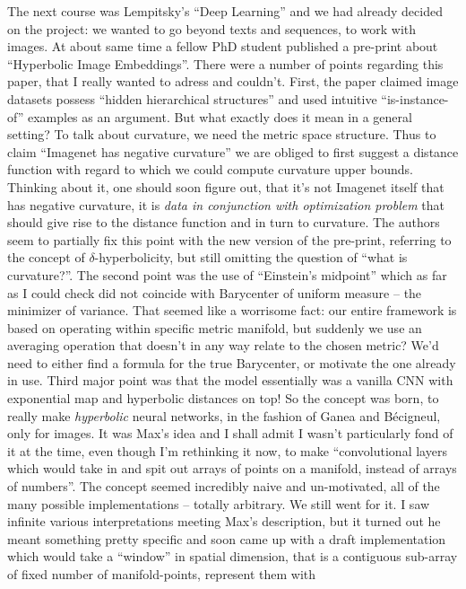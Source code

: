 The next course was Lempitsky's ``Deep Learning'' and we had already decided on
the project: we wanted to go beyond texts and sequences, to work with images.
At about same time a fellow PhD student published a pre-print about
``Hyperbolic Image Embeddings''. There were a number of points regarding this
paper, that I really wanted to adress and couldn't. First, the paper claimed
image datasets possess ``hidden hierarchical structures'' and used intuitive
``is-instance-of'' examples as an argument. But what exactly does it mean in a
general setting? To talk about curvature, we need the metric space structure.
Thus to claim ``Imagenet has negative curvature'' we are obliged to first
suggest a distance function with regard to which we could compute curvature
upper bounds. Thinking about it, one should soon figure out, that it's not
Imagenet itself that has negative curvature, it is \emph{data in conjunction
with optimization problem} that should give rise to the distance function and
in turn to curvature. The authors seem to partially fix this point with the new
version of the pre-print, referring to the concept of \( \delta \)-hyperbolicity,
but still omitting the question of ``what is curvature?''.
The second point was the use of ``Einstein's midpoint''
which as far as I could check did not coincide with Barycenter of uniform
measure -- the minimizer of variance. That seemed like
a worrisome fact: our entire framework is based on operating within specific
metric manifold, but suddenly we use an averaging operation that doesn't in any
way relate to the chosen metric? We'd need to either find a formula for the
true Barycenter, or motivate the one already in use. Third major point was that
the model essentially was a vanilla CNN with exponential map and hyperbolic
distances on top! So the concept was born, to really make \emph{hyperbolic}
neural networks, in the fashion of Ganea and B\'ecigneul, only for images.
It was Max's idea and I shall admit I wasn't particularly fond of it at the
time, even though I'm rethinking it now, to make ``convolutional layers which
would take in and spit out arrays of points on a manifold, instead of arrays of
numbers''. The concept seemed incredibly naive and un-motivated, all of the
many possible implementations -- totally arbitrary. We still went for it.  I
saw infinite various interpretations meeting Max's description, but it turned
out he meant something pretty specific and soon came up with a draft
implementation which would take a ``window'' in spatial dimension, that is a
contiguous sub-array of fixed number of manifold-points, represent them with
